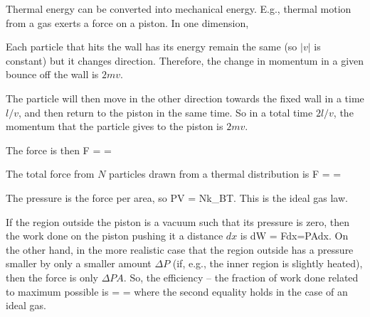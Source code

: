 \documentclass[11pt]{book}
\begin{document}




Thermal energy can be converted into mechanical energy.  E.g., thermal motion from a gas exerts a force on a piston. In one dimension,
\bei
\item Each particle that hits the wall has its energy remain the same (so $|v|$ is constant) but it changes direction. Therefore, the change in momentum in a given bounce off the wall is $2mv$. 
\item The particle will then move in the other direction towards the fixed wall in a time $l/v$, and then return to the piston in the same time. So in a total time $2l/v$, the momentum that the particle gives to the piston is $2mv$. 
\item The force is then 
\be F =  = 
\ee
\item The total force from $N$ particles drawn from a thermal distribution is
\be
F =  = 
\ee
\item The pressure is the force per area, so
\be
PV = Nk_BT.
\ee
\eei
This is the ideal gas law.


If the region outside the piston is a vacuum such that its pressure is zero, then the work done on the piston pushing it a distance $dx$ is
\be
dW = Fdx=PAdx.\ee
On the other hand, in the more realistic case that the region outside has a pressure smaller by only a smaller amount $\Delta P$ (if, e.g., the inner region is slightly heated), then the force is only $\Delta P A$. So, the efficiency -- the fraction of work done related to maximum possible is
\be
\eta =  = 
\ee
where the second equality holds in the case of an ideal gas.
\end{document}
